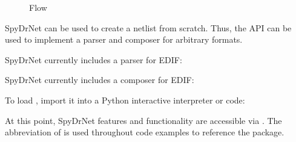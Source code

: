 \documentclass[letterpaper,10pt,english,openany,oneside]{sphinxmanual}
\begin{document}
\begin{figure}[H]
\centering
\capstart

\noindent{}
\caption{Flow}\label{\detokenize{reference/introduction:id3}}\label{\detokenize{reference/introduction:fig-flow}}\end{figure}

SpyDrNet can be used to create a netlist from scratch. Thus, the API can be used to implement a parser and composer for arbitrary formats.


SpyDrNet currently includes a parser for EDIF:

\begin{sphinxVerbatim}[commandchars=\\\{\}]
  
\end{sphinxVerbatim}


SpyDrNet currently includes a composer for EDIF:

\begin{sphinxVerbatim}[commandchars=\\\{\}]
 
\end{sphinxVerbatim}


To load , import it into a Python interactive interpreter or code:

\begin{sphinxVerbatim}[commandchars=\\\{\}]
   
\end{sphinxVerbatim}

At this point, SpyDrNet features and functionality are accessible via . The abbreviation of
 is used throughout code examples to reference the  package.
\end{document}

